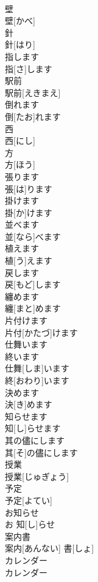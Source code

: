 \documentclass[8pt]{extreport}
\begin{document}
\begin{CJK}{UTF8}{min}
\\	壁	
\\	壁[かべ]	
\\	針	
\\	針[はり]	
\\	指します	
\\	指[さ]します	
\\	駅前	
\\	駅前[えきまえ]	
\\	倒れます	
\\	倒[たお]れます	
\\	西	
\\	西[にし]	
\\	方	
\\	方[ほう]	
\\	張ります	
\\	張[は]ります	
\\	掛けます	
\\	掛[か]けます	
\\	並べます	
\\	並[なら]べます	
\\	植えます	
\\	植[う]えます	
\\	戻します	
\\	戻[もど]します	
\\	纏めます	
\\	纏[まと]めます	
\\	片付けます	
\\	片付[かたづ]けます	
\\	仕舞います
\\	終います	
\\	仕舞[しま]います
\\	終[おわり]います	
\\	決めます	
\\	決[き]めます	
\\	知らせます	
\\	知[し]らせます	
\\	其の儘にします	
\\	其[そ]の儘にします	
\\	授業	
\\	授業[じゅぎょう]	
\\	予定	
\\	予定[よてい]	
\\	お知らせ	
\\	お 知[し]らせ	
\\	案内書	
\\	案内[あんない] 書[しょ]	
\\	カレンダー	
\\	カレンダー	

\end{CJK}
\end{document}
